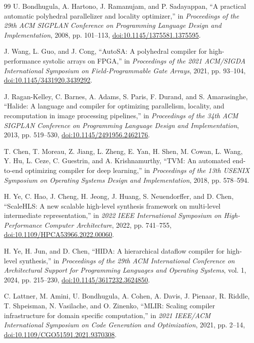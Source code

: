 \documentclass{article}
\newcommand{\doilink}[1]{\href{https://doi.org/#1}{doi:#1}}
\begin{document}
\begin{thebibliography}{99}
U. Bondhugula, A. Hartono, J. Ramanujam, and P. Sadayappan,
``A practical automatic polyhedral parallelizer and locality optimizer,''
in \emph{Proceedings of the 29th ACM SIGPLAN Conference on Programming Language Design and Implementation},
2008, pp. 101--113, \doilink{10.1145/1375581.1375595}.

J. Wang, L. Guo, and J. Cong,
``AutoSA: A polyhedral compiler for high-performance systolic arrays on FPGA,''
in \emph{Proceedings of the 2021 ACM/SIGDA International Symposium on Field-Programmable Gate Arrays},
2021, pp. 93--104, \doilink{10.1145/3431920.3439292}.

J. Ragan-Kelley, C. Barnes, A. Adams, S. Paris, F. Durand, and S. Amarasinghe,
``Halide: A language and compiler for optimizing parallelism, locality, and recomputation in image processing pipelines,''
in \emph{Proceedings of the 34th ACM SIGPLAN Conference on Programming Language Design and Implementation},
2013, pp. 519--530, \doilink{10.1145/2491956.2462176}.

T. Chen, T. Moreau, Z. Jiang, L. Zheng, E. Yan, H. Shen, M. Cowan,
L. Wang, Y. Hu, L. Ceze, C. Guestrin, and A. Krishnamurthy,
``TVM: An automated end-to-end optimizing compiler for deep learning,''
in \emph{Proceedings of the 13th USENIX Symposium on Operating Systems Design and Implementation},
2018, pp. 578--594.

H. Ye, C. Hao, J. Cheng, H. Jeong, J. Huang, S. Neuendorffer, and D. Chen,
``ScaleHLS: A new scalable high-level synthesis framework on multi-level intermediate representation,''
in \emph{2022 IEEE International Symposium on High-Performance Computer Architecture},
2022, pp. 741--755, \doilink{10.1109/HPCA53966.2022.00060}.

H. Ye, H. Jun, and D. Chen,
``HIDA: A hierarchical dataflow compiler for high-level synthesis,''
in \emph{Proceedings of the 29th ACM International Conference on Architectural Support for Programming Languages and Operating Systems},
vol. 1, 2024, pp. 215--230, \doilink{10.1145/3617232.3624850}.

C. Lattner, M. Amini, U. Bondhugula, A. Cohen, A. Davis, J. Pienaar,
R. Riddle, T. Shpeisman, N. Vasilache, and O. Zinenko,
``MLIR: Scaling compiler infrastructure for domain specific computation,''
in \emph{2021 IEEE/ACM International Symposium on Code Generation and Optimization},
2021, pp. 2--14, \doilink{10.1109/CGO51591.2021.9370308}.


\end{thebibliography}
\end{document}
